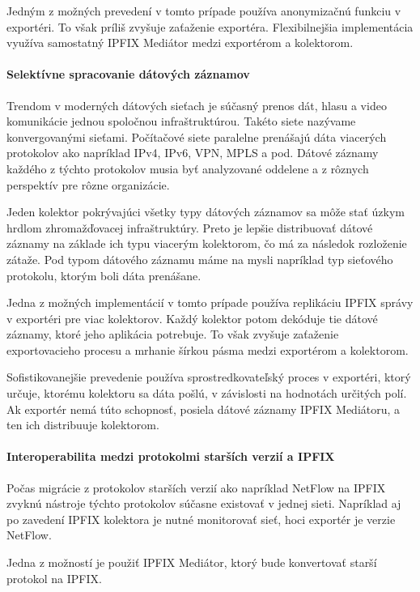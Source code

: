 Jedným z možných prevedení v tomto prípade používa anonymizačnú funkciu v exportéri. 
To však príliš zvyšuje zaťaženie exportéra. Flexibilnejšia implementácia využíva samostatný 
IPFIX Mediátor medzi exportérom a kolektorom.


\paragraph{Selektívne spracovanie dátových záznamov}

Trendom v moderných dátových sieťach je súčasný prenos dát, hlasu a video komunikácie jednou 
spoločnou infraštruktúrou. Takéto siete nazývame konvergovanými sieťami. 
Počítačové siete paralelne prenášajú dáta viacerých protokolov ako napríklad
IPv4, IPv6, VPN, MPLS a pod. Dátové záznamy každého z týchto protokolov musia byť analyzované 
oddelene a z rôznych perspektív pre rôzne organizácie.

Jeden kolektor pokrývajúci všetky typy dátových záznamov sa môže stať úzkym hrdlom 
zhromažďovacej infraštruktúry. Preto je lepšie distribuovať dátové záznamy na základe ich 
typu viacerým kolektorom, čo má za následok rozloženie zátaže. Pod typom dátového 
záznamu máme na mysli napríklad typ sieťového protokolu, ktorým boli dáta prenášane. 

Jedna z možných implementácií v tomto prípade používa replikáciu IPFIX správy v exportéri 
pre viac kolektorov. Každý kolektor potom dekóduje tie dátové záznamy, ktoré jeho aplikácia
potrebuje. To však zvyšuje zaťaženie exportovacieho procesu a mrhanie šírkou pásma medzi
exportérom a kolektorom.

Sofistikovanejšie prevedenie používa sprostredkovateľský proces v exportéri, ktorý určuje, 
ktorému kolektoru sa dáta pošlú, v závislosti na hodnotách určitých polí. Ak exportér nemá
túto schopnosť, posiela dátové záznamy IPFIX Mediátoru, a ten ich distribuuje kolektorom.


\paragraph{Interoperabilita medzi protokolmi starších verzií a IPFIX}

Počas migrácie z protokolov starších verzií ako napríklad NetFlow \citep{rfc3954} na IPFIX
zvyknú nástroje týchto protokolov súčasne existovať v jednej sieti. Napríklad aj po zavedení 
IPFIX kolektora je nutné monitorovať sieť, hoci exportér je verzie NetFlow.

Jedna z možností je použiť IPFIX Mediátor, ktorý bude konvertovať starší protokol na IPFIX.

